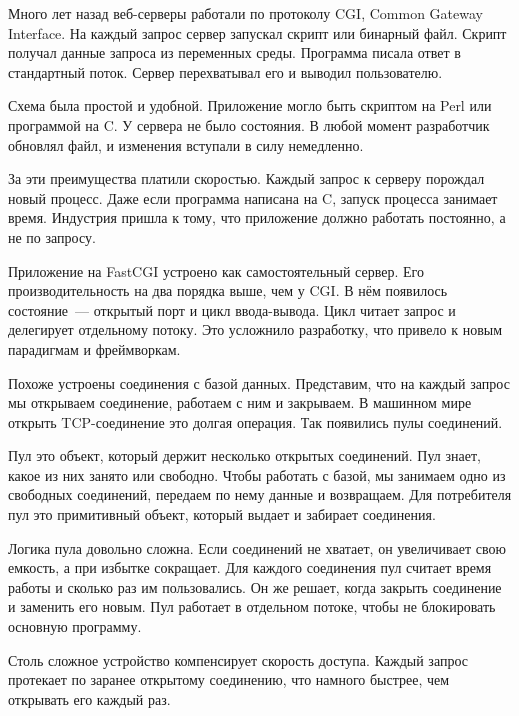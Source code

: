
Много лет назад веб-серверы работали по протоколу CGI, Common Gateway
Interface. На
каждый запрос сервер запускал скрипт или бинарный файл. Скрипт получал данные
запроса из переменных среды. Программа писала ответ в стандартный поток. Сервер
перехватывал его и выводил пользователю.

Схема была простой и удобной. Приложение могло быть скриптом на Perl или
программой на C\Plus\Plus. У сервера не было состояния. В любой момент
разработчик обновлял файл, и изменения вступали в силу немедленно.

За эти преимущества платили скоростью. Каждый запрос к серверу порождал новый
процесс. Даже если программа написана на C, запуск процесса занимает
время. Индустрия пришла к тому, что приложение должно работать постоянно, а не
по запросу.


Приложение на FastCGI устроено как самостоятельный сервер. Его
производительность на два порядка выше, чем у CGI. В н\"{е}м появилось
состояние~--- открытый порт и цикл ввода-вывода. Цикл читает запрос и делегирует
отдельному потоку. Это усложнило разработку, что привело к новым парадигмам
и фреймворкам.

Похоже устроены соединения с базой данных. Представим, что на каждый запрос мы
открываем соединение, работаем с ним и закрываем. В машинном мире открыть
TCP-соединение это долгая операция. Так появились пулы соединений.


Пул это объект, который держит несколько открытых соединений. Пул знает, какое
из них занято или свободно. Чтобы работать с базой, мы занимаем одно из
свободных соединений, передаем по нему данные и возвращаем. Для потребителя пул
это примитивный объект, который выдает и забирает соединения.

Логика пула довольно сложна. Если соединений не хватает, он
увеличивает свою емкость, а при избытке сокращает. Для каждого соединения пул
считает время работы и сколько раз им пользовались. Он же решает, когда закрыть
соединение и заменить его новым. Пул работает в отдельном потоке, чтобы не
блокировать основную программу.

Столь сложное устройство компенсирует скорость доступа. Каждый запрос протекает
по заранее открытому соединению, что намного быстрее, чем открывать его каждый
раз.

